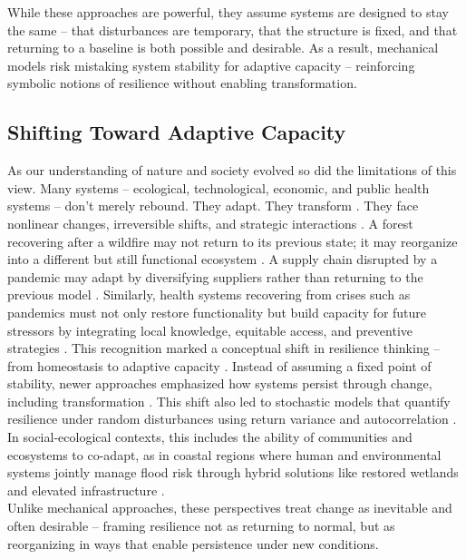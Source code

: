 While these approaches are powerful, they assume systems are designed to stay the same -- that disturbances are temporary, that the structure is fixed, and that returning to a baseline is both possible and desirable. As a result, mechanical models risk mistaking system stability for adaptive capacity -- reinforcing symbolic notions of resilience without enabling transformation.

\subsection{Shifting Toward Adaptive Capacity}
\label{appendix:A2}
As our understanding of nature and society evolved so did the limitations of this view. Many systems -- ecological, technological, economic, and public health systems -- don’t merely rebound. They adapt. They transform \autocite{folke2010resilience}. They face nonlinear changes, irreversible shifts, and strategic interactions \autocite{gunderson2002panarchy}. A forest recovering after a wildfire may not return to its previous state; it may reorganize into a different but still functional ecosystem \autocite{walker2004resilience}. A supply chain disrupted by a pandemic may adapt by diversifying suppliers rather than returning to the previous model \autocite{ivanov2022viable}. Similarly, health systems recovering from crises such as pandemics must not only restore functionality but build capacity for future stressors by integrating local knowledge, equitable access, and preventive strategies \autocite{norris2008community, kruk2017building}. This recognition marked a conceptual shift in resilience thinking -- from homeostasis to adaptive capacity \autocite{folke2004regime}. Instead of assuming a fixed point of stability, newer approaches emphasized how systems persist through change, including transformation \autocite{walker2004resilience}. This shift also led to stochastic models that quantify resilience under random disturbances using return variance and autocorrelation \autocite{ives1995measuring}. In social-ecological contexts, this includes the ability of communities and ecosystems to co-adapt, as in coastal regions where human and environmental systems jointly manage flood risk through hybrid solutions like restored wetlands and elevated infrastructure \autocite{adger2005socialecological}.\\

Unlike mechanical approaches, these perspectives treat change as inevitable and often desirable -- framing resilience not as returning to normal, but as reorganizing in ways that enable persistence under new conditions.

